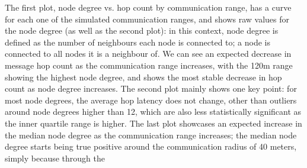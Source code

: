 The first plot, node degree vs. hop count by communication range, has a curve for each one of the simulated communication ranges, and shows raw values for the node degree (as well as the second plot): in this context, node degree is defined as the number of neighbours each node is connected to; a node is connected to all nodes it is a neighbour of. We can see an expected decrease in message hop count as the communication range increases, with the 120m range showing the highest node degree, and shows the most stable decrease in hop count as node degree increases.
The second plot mainly shows one key point: for most node degrees, the average hop latency does not change, other than outliers around node degrees higher than 12, which are also less statistically significant as the inner quartile range is higher.
The last plot showcases an expected increase in the median node degree as the communication range increases; the median node degree starts being true positive around the communication radius of 40 meters, simply because through the 